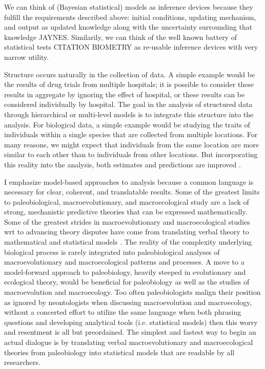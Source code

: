 We can think of (Bayesian statistical) models as inference devices because they fulfill the requirements described above: initial conditions, updating mechanism, and output as updated knowledge along with the uncertainty surrounding that knowledge \citep{McElreath2016} JAYNES. Similarily, we can think of the well known battery of statistical tests CITATION \uppercase{Biometry} as re-usable inference devices with very narrow utility.


Structure occurs naturally in the collection of data. A simple example would be the results of drug trials from multiple hospitals; it is possible to consider these results in aggregate by ignoring the effect of hospital, or these results can be considered individually by hospital. The goal in the analysis of structured data through hierarchical or multi-level models is to integrate this structure into the analysis. For biological data, a simple example would be studying the traits of individuals within a single species that are collected from multiple locations. For many reasons, we might expect that individuals from the same location are more similar to each other than to individuals from other locations. But incorporating this reality into the analysis, both estimates and predictions are improved \citep{Gelman2007,Gelman2013d,McElreath2016}.

I emphasize model-based approaches to analysis because a common language is necessary for clear, coherent, and translatable results. Some of the greatest limits to paleobiological, macroevolutionary, and macroecological study are a lack of strong, mechanistic predictive theories that can be expressed mathematically. Some of the greatest strides in macroevolutionary and macroecological studies wrt to advancing theory disputes have come from translating verbal theory to mathematical and statistical models \citep{Hunt2006a,Hunt2007,Shipley2006}. The reality of the complexity underlying biological process is rarely integrated into paleobiological analyses of macroevolutionary and macroecological patterns and processes. A move to a model-forward approach to paleobiology, heavily steeped in evolutionary and ecological theory, would be beneficial for paleobiology as well as the studies of macroevolution and macroecology. Too often paleobiologists malign their position as ignored by neontologists when discussing macroevolution and macroecology, without a concerted effort to utilize the same language when both phrasing questions and developing analytical tools (i.e. statistical models) then this worry and resentment is all but preordained. The simplest and fastest way to begin an actual dialogue is by translating verbal macroevolutionary and macroecological theories from paleobiology into statistical models that are readable by all researchers.


